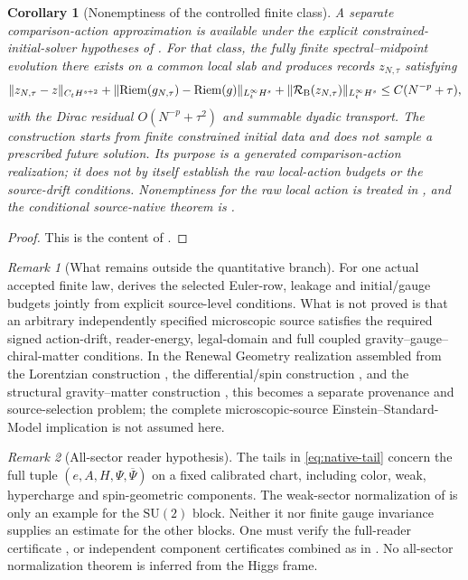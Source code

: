 \documentclass[11pt]{article}
\numberwithin{equation}{section}
\newtheorem{corollary}[corollary]{Corollary}
\theoremstyle{definition}
\theoremstyle{remark}
\newtheorem{remark}[remark]{Remark}
\newcommand{\SU}{\mathrm{SU}}
\newcommand{\Riem}{\operatorname{Riem}}
\newcommand{\norm}[1]{\lVert#1\rVert}
\newcommand{\bPsi}{\overline\Psi}
\begin{document}
\begin{corollary}[Nonemptiness of the controlled finite class]
\label{cor:generated-nonempty}
A separate comparison-action approximation is available under the explicit constrained-initial-solver hypotheses of .  For that class, the fully finite spectral--midpoint evolution there exists on a common local slab and produces records $z_{N,\tau}$ satisfying
\begin{equation}
 \norm{z_{N,\tau}-z}_{C_tH^{s+2}}
 +\norm{\Riem(g_{N,\tau})-\Riem(g)}_{L^\infty_tH^s}
 +\norm{\mathcal R_{\rm B}(z_{N,\tau})}_{L^\infty_tH^s}
 \le C(N^{-p}+\tau),
 \label{eq:generated-nonempty}
\end{equation}
with the Dirac residual $O(N^{-p}+\tau^2)$ and summable dyadic transport.  The construction starts from finite constrained initial data and does not sample a prescribed future solution.  Its purpose is a generated comparison-action realization; it does not by itself establish the raw local-action budgets or the source-drift conditions.  Nonemptiness for the raw local action is treated in , and the conditional source-native theorem is .
\end{corollary}
\begin{proof}
This is the content of .
\end{proof}

\begin{remark}[What remains outside the quantitative branch]
\label{rem:native-boundary}
For one actual accepted finite law,  derives the selected Euler-row, leakage and initial/gauge budgets jointly from explicit source-level conditions.  What is not proved is that an arbitrary independently specified microscopic source satisfies the required signed action-drift, reader-energy, legal-domain and full coupled gravity--gauge--chiral-matter conditions.  In the Renewal Geometry realization assembled from the Lorentzian construction \cite{PelissierRenewalSpacetime2026}, the differential/spin construction \cite{PelissierSpectral2026}, and the structural gravity--matter construction \cite{PelissierDuality2026}, this becomes a separate provenance and source-selection problem; the complete microscopic-source Einstein--Standard-Model implication is not assumed here.
\end{remark}

\begin{remark}[All-sector reader hypothesis]
\label{rem:all-sector-reader}
The tails in \eqref{eq:native-tail} concern the full tuple
$(e,A,H,\Psi,\bPsi)$ on a fixed calibrated chart, including color,
weak, hypercharge and spin-geometric components.  The weak-sector
normalization of  is only an example for the
$\SU(2)$ block.  Neither it nor finite gauge invariance supplies an estimate
for the other blocks.  One must verify the full-reader certificate
, or independent component certificates combined
as in .  No all-sector normalization theorem
is inferred from the Higgs frame.
\end{remark}
\end{document}
